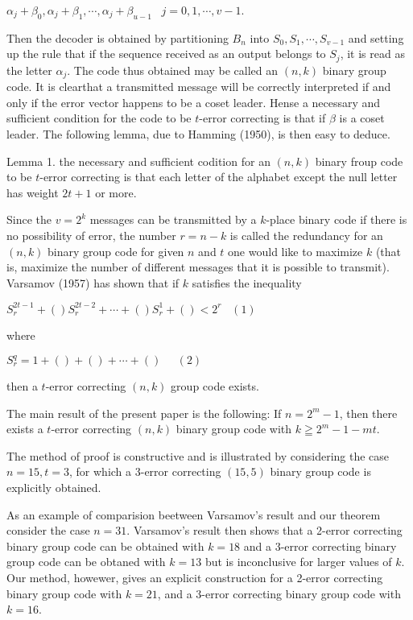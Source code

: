 \documentclass{article}
\begin{document}
$\alpha_j+\beta_0,\alpha_j+\beta_1,\cdots,\alpha_j+\beta_{u-1}\;\;\; j=0,1,\cdots,v-1$.

Then the decoder is obtained by partitioning $B_n$ into $S_0,S_1,\cdots,S_{v-1}$ and setting up the rule that if the sequence received as an output belongs to $S_j$, it is read as the letter $\alpha_j$. The code thus obtained may be called an $(n,k)$ binary group code. It is clearthat a transmitted message will be correctly interpreted if and only if the error vector happens to be a coset leader. Hense a necessary and sufficient condition for the code to be $t$-error correcting is that if $\beta$ is a coset leader. The following lemma, due to Hamming (1950), is then easy to deduce.

Lemma 1. the necessary and sufficient codition for an $(n,k)$ binary froup code to be $t$-error correcting is that each letter of the alphabet except the null letter has weight $2t+1$ or more.

Since the $v=2^k$ messages can be transmitted by a $k$-place binary code if there is no possibility of error, the number $r=n-k$ is called the redundancy for an $(n,k)$ binary group code for given $n$ and $t$ one would like to maximize $k$ (that is, maximize the number of different messages that it is possible to transmit). Varsamov (1957) has shown that if $k$ satisfies the inequality

$S_r^{2t-1}+()S_r^{2t-2}+\cdots+()S_r^1+()<2^r    \;\;\;(1)$

where 

$S_r^q=1+()+()+\cdots+()\;\;\;\;\;(2)$

then a $t$-error correcting $(n,k)$ group code exists.

The main result of the present paper is the following: If $n=2^m-1$, then there exists a $t$-error correcting $(n,k)$ binary group code with $k\geqq 2^m-1-mt$.

The method of proof is constructive and is illustrated by considering the case $n=15,t=3$, for which a 3-error correcting $(15,5)$ binary group code is explicitly obtained.

As an example of comparision beetween Varsamov's result and our theorem consider the case $n=31$. Varsamov's result then shows that a 2-error correcting binary group code can be obtained with $k=18$ and a 3-error correcting binary group code can be obtaned with $k=13$ but is inconclusive for larger values of $k$. Our method, howewer, gives an explicit construction for a 2-error correcting binary group code with $k=21$, and a 3-error correcting binary group code with $k=16$.
\end{document}
